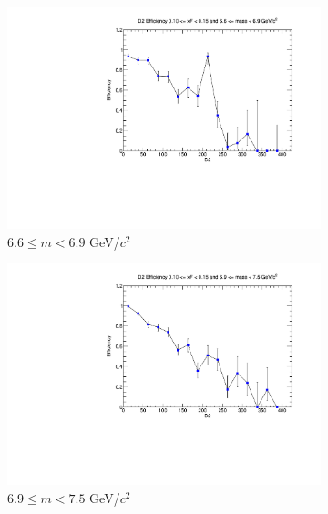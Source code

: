 \begin{figure}[p]
\begin{subfigure}[b]{0.32\textwidth}
        \includegraphics[width=\textwidth]{./kTrackerEfficiencyPlots/D2_Efficiency_xF2_mass8.pdf}
        \caption{$6.6 \leq m < 6.9$ GeV/$c^2$}
        \label{fig:xF2_mass8}
    \end{subfigure}
    \vspace{0.5cm}
    \begin{subfigure}[b]{0.32\textwidth}
        \centering
        \includegraphics[width=\textwidth]{./kTrackerEfficiencyPlots/D2_Efficiency_xF2_mass9.pdf}
        \caption{$6.9 \leq m < 7.5$ GeV/$c^2$}
        \label{fig:xF2_mass9}
    \end{subfigure}
    \hfill
    \begin{subfigure}[b]{0.32\textwidth}
        \centering

\end{subfigure}
\end{figure}
